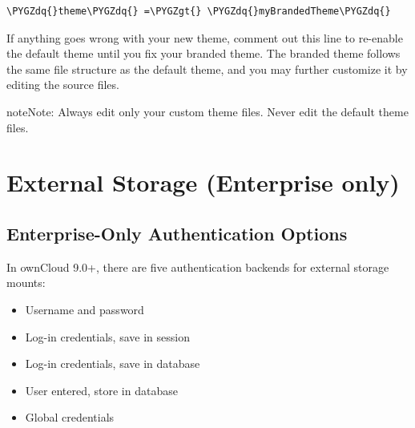 \documentclass[letterpaper,10pt,english]{sphinxmanual}
\def\PYGZgt{\char`\>}
\def\PYGZdq{\char`\"}
\begin{document}
\begin{Verbatim}[commandchars=\\\{\}]
\PYGZdq{}theme\PYGZdq{} =\PYGZgt{} \PYGZdq{}myBrandedTheme\PYGZdq{}
\end{Verbatim}

If anything goes wrong with your new theme, comment out this line to re-enable
the default theme until you fix your branded theme. The branded theme follows
the same file structure as the default theme, and you may further customize it
by editing the source files.

\begin{notice}{note}{Note:}
Always edit only your custom theme files. Never edit the default
theme files.
\end{notice}


\section{External Storage (Enterprise only)}
\label{enterprise_external_storage/index:external-storage-enterprise-only}\label{enterprise_external_storage/index::doc}

\subsection{Enterprise-Only Authentication Options}
\label{enterprise_external_storage/enterprise_only_auth:enterprise-only-authentication-options}\label{enterprise_external_storage/enterprise_only_auth::doc}
In ownCloud 9.0+, there are five authentication backends for external storage
mounts:
\begin{itemize}
\item {} 
Username and password

\item {} 
Log-in credentials, save in session

\item {} 
Log-in credentials, save in database

\item {} 
User entered, store in database

\item {} 
Global credentials

\end{itemize}
\end{document}
